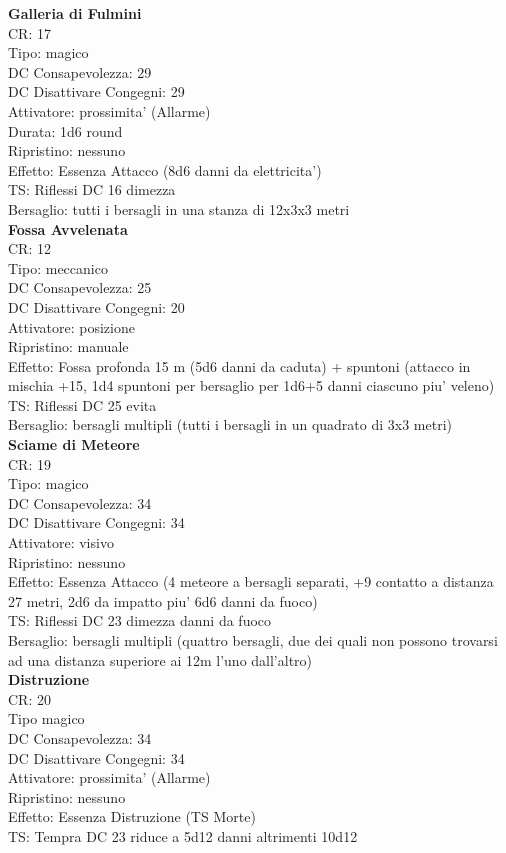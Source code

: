 \documentclass[a4paper,11pt,twoside,openany]{dndbook}
\begin{document}
\begin{multicols}{2}
\textbf{Galleria di Fulmini}\\
CR: 17 \\
Tipo: magico \\
DC Consapevolezza: 29 \\
DC Disattivare Congegni: 29 \\
Attivatore: prossimita' (Allarme) \\
Durata: 1d6 round \\
Ripristino: nessuno \\
Effetto: Essenza Attacco (8d6 danni da elettricita') \\
TS: Riflessi DC 16 dimezza \\
Bersaglio: tutti i bersagli in una stanza di 12x3x3 metri\\

\textbf{Fossa Avvelenata}\\
CR: 12 \\
Tipo: meccanico \\
DC Consapevolezza: 25 \\
DC Disattivare Congegni: 20 \\
Attivatore: posizione \\
Ripristino: manuale \\
Effetto: Fossa profonda 15 m (5d6 danni da caduta) + spuntoni (attacco in mischia +15, 1d4 spuntoni per bersaglio per 1d6+5 danni ciascuno piu' veleno)\\
TS: Riflessi DC 25 evita \\
Bersaglio: bersagli multipli (tutti i bersagli in un quadrato di 3x3 metri)\\

\textbf{Sciame di Meteore}\\
CR: 19 \\
Tipo: magico \\
DC Consapevolezza: 34 \\
DC Disattivare Congegni: 34 \\
Attivatore: visivo\\
Ripristino: nessuno \\
Effetto: Essenza Attacco (4 meteore a bersagli separati, +9 contatto a distanza 27 metri, 2d6 da impatto piu' 6d6 danni da fuoco)\\
TS: Riflessi DC 23 dimezza danni da fuoco\\
Bersaglio: bersagli multipli (quattro bersagli, due dei quali non possono trovarsi ad una distanza superiore ai 12m l’uno dall’altro)\\

\textbf{Distruzione}\\
CR: 20 \\
Tipo magico \\
DC Consapevolezza: 34 \\
DC Disattivare Congegni: 34 \\
Attivatore: prossimita' (Allarme) \\
Ripristino: nessuno \\
Effetto: Essenza Distruzione (TS Morte)\\
TS: Tempra DC 23 riduce a 5d12 danni altrimenti 10d12\\

\end{multicols}
\end{document}
